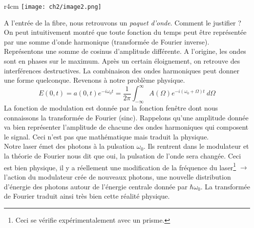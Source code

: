 \begin{wrapfigure}[15]{r}{4cm}
\vspace{-5mm}
\texttt{[image: ch2/image2.png]}
\end{wrapfigure}
A l'entrée de la fibre, nous retrouvons un \textit{paquet d'onde}. Comment le justifier ? On 
peut intuitivement montré que toute fonction du temps peut être représentée par une 
somme d'onde harmonique (transformée de Fourier inverse). Représentons une somme de cosinus 
d'amplitude différente. A l'origine, les ondes sont en phases sur le maximum. Après un certain 
éloignement, on retrouve des interférences destructives. La combinaison des ondes harmoniques 
peut donner une forme quelconque. Revenons à notre problème physique. 
\begin{equation}
E(0,t) = a(0,t)e^{-i\omega_0t} = \dfrac{1}{2\pi}\int_{-\infty}^\infty A(\Omega)e^{-i(\omega_0
+\Omega)t}\ d\Omega
\end{equation}
La fonction de modulation est donnée par la fonction fenêtre dont nous connaissons la 
transformée de Fourier (sinc). Rappelons qu'une amplitude donnée va bien représenter 
l'amplitude de chacune des ondes harmoniques qui composent le signal. Ceci n'est pas que 
mathématique mais traduit la physique.\\

Notre laser émet des photons à la pulsation $\omega_0$. Ils rentrent dans le modulateur et la 
théorie de Fourier nous dit que oui, la pulsation de l'onde sera changée. Ceci est bien 
physique, il y a réellement une modification de la fréquence du laser\footnote{Ceci se vérifie 
expérimentalement avec un prisme.} $\rightarrow$ l'action du modulateur crée de nouveaux 
photons, une nouvelle distribution d'énergie des photons autour de l'énergie centrale donnée 
par $\hbar\omega_0$. La transformée de Fourier traduit ainsi très bien cette réalité physique.\\

